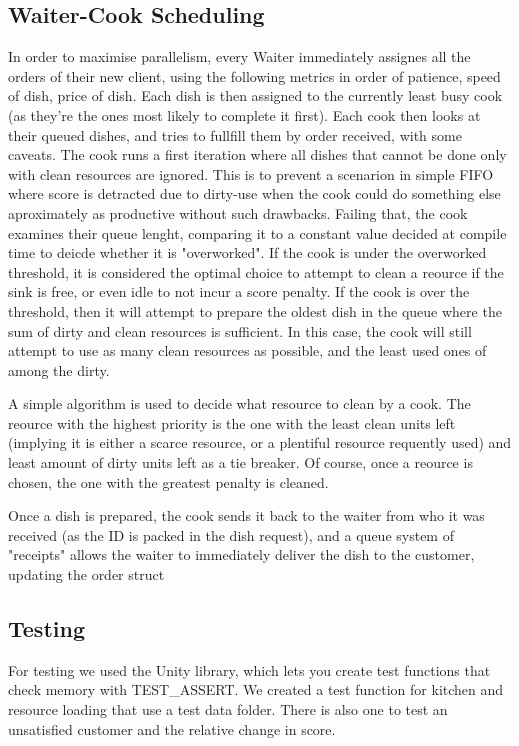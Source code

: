 \documentclass{article}
\begin{document}
\newpage
\subsection{Waiter-Cook Scheduling}
In order to maximise parallelism, every Waiter immediately assignes all the orders of their new client, using the following metrics in order of patience, speed of dish, price of dish. Each dish is then assigned to the currently least busy cook (as they're the ones most likely to complete it first).
Each cook then looks at their queued dishes, and tries to fullfill them by order received, with some caveats.
The cook runs a first iteration where all dishes that cannot be done only with clean resources are ignored. This is to prevent a scenarion in simple FIFO where score is detracted due to dirty-use when the cook could do something else aproximately as productive without such drawbacks.
Failing that, the cook examines their queue lenght, comparing it to a constant value decided at compile time to deicde whether it is "overworked".
If the cook is under the overworked threshold, it is considered the optimal choice to attempt to clean a reource if the sink is free, or even idle to not incur a score penalty.
If the cook is over the threshold, then it will attempt to prepare the oldest dish in the queue where the sum of dirty and clean resources is sufficient. In this case, the cook will still attempt to use as many clean resources as possible, and the least used ones of among the dirty.

A simple algorithm is used to decide what resource to clean by a cook. The reource with the highest priority is the one with the least clean units left (implying it is either a scarce resource, or a plentiful resource requently used) and least amount of dirty units left as a tie breaker.
Of course, once a reource is chosen, the one with the greatest penalty is cleaned.

Once a dish is prepared, the cook sends it back to the waiter from who it was received (as the ID is packed in the dish request), and a queue system of "receipts" allows the waiter to immediately deliver the dish to the customer, updating the order struct

\subsection{Testing}
For testing we used the Unity library, which lets you create test functions that check memory with TEST\_ASSERT. We created a test function for kitchen and resource loading that use a test data folder. There is also one to test an unsatisfied customer and the relative change in score.
\end{document}
